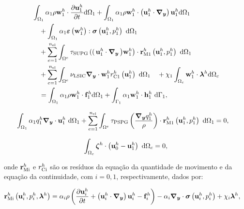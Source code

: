 \documentclass[tese_patricia]{subfiles}
\begin{document}
\begin{align}
	\begin{split}
		&\int_{\localModel} \arlequinWFLocal \density \wlocalh \cdot \frac{\partial\ulocalh}{\partial t} \deriv \localModel +
		\int_{\localModel} \arlequinWFLocal \density \wlocalh \cdot  \left(\ulocalh \cdot \gradient \right)\ulocalh \deriv \localModel  \\ 
		&\quad+	
		\int_{\localModel} \arlequinWFLocal \straintensor \left(\wlocalh\right) : \stresstensor \left(\ulocalh,\plocalh\right)\ \deriv \localModel 
		\\ 
		&\quad+ \sum_{e=1}^{\nel} \int_{\domainE} \SUPG  \left( \right(\ulocalh \cdot \gradient \left) \wlocalh\right) \cdot \resMomLocal\left(\ulocalh,\plocalh \right)\  \deriv \localModel \\ 
		&\quad+\sum_{e=1}^{\nel} \int_{\domainE} \LSIC \divergence \cdot \wlocalh \resPreLocal
		\left(\ulocalh\right)\  \deriv \localModel 
		\quad+ \chi_{1} \int_{\gluingZone} \wlocalh \cdot \lagrangeMultiplierh \deriv \gluingZone  \\
		&\quad= \int_{\localModel} \arlequinWFLocal \density \wlocalh \cdot  \localsbodyforceh \deriv \localModel + \int_{\localBoundary} \arlequinWFLocal \wlocalh \cdot \localSurfaceLoadh\ \deriv \localBoundary,
		\label{eq:QM_forma_fraca_1}
	\end{split}
\end{align}


\begin{align}
	\begin{split}
		&	\int_{\Omega_1} \alpha_1 q_1^h \boldsymbol{\nabla_y} \cdot \mathbf{u}_1^h \ \mathrm{d} \Omega_1 +
		\sum_{e=1}^{n_{\mathrm{el}}} \int_{\Omega^e} \tau_{\mathrm{PSPG}} \left(\frac{\boldsymbol{\nabla_y} q_1^h}{\rho}\right) \cdot \mathbf{r}_{\mathrm{M1}}^{h} \left(\mathbf{u}_1^h,p_1^h\right) \  \mathrm{d} \Omega_1 = 0,
		\label{eq:C_forma_fraca_1}
	\end{split}
\end{align}

\begin{align}
	\int_{\Omega_c}  \boldsymbol{\zeta}^h  \cdot \left(\mathbf{u}_0^h - \mathbf{u}_1^h \right) \ \mathrm{d} \Omega_c = 0, 
		\label{eq:lag_acopl}
\end{align}



\noindent onde $\mathbf{r}_{\mathrm{Mi}}^{h}$ e ${r_{\mathrm{Ci}}^{h}}$ são os resíduos da equação da quantidade de movimento e da equação da continuidade, com $i=0,1$, respectivamente, dados por:

\begin{align}
	\mathbf{r}_{\mathrm{Mi}}^{h} \left(\mathbf{u}_i^{h},p_i^{h},\boldsymbol{\lambda}^h \right)&=\alpha_i \rho\left(\frac{\partial\mathbf{u}_i^{h}}{\partial t}+ \left( \mathbf{u}_i^{h} \cdot \boldsymbol{\nabla_y} \right) \mathbf{u}_i^{h} - \mathbf{f}_i^{h}\right) - \alpha_i \boldsymbol{\nabla_y} \cdot \boldsymbol{\sigma}\left(\mathbf{u}_i^{h},p_i^{h}\right)+ \chi_{i} \boldsymbol{\lambda}^h \label{eq:res_QM_i},
\end{align}
\end{document}
